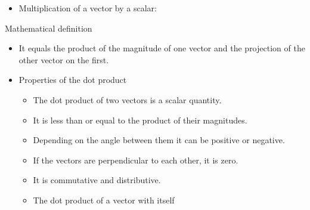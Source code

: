\ELhold


\begin{ELunit}


\begin{itemize}
\tightlist
\item
  Multiplication of a vector by a scalar:
\end{itemize}


\end{ELunit}

\ELhold


\begin{ELdefinition}{Mathematical definition}


\begin{itemize}
\tightlist
\item
  It equals the product of the magnitude of one vector and the projection of the other vector on the first.
\end{itemize}

\end{ELdefinition}

\begin{ELunit}


\begin{itemize}
\tightlist
\item
  Properties of the dot product

  \begin{itemize}
  \item
    The dot product of two vectors is a scalar quantity.
  \item
    It is less than or equal to the product of their magnitudes.
  \item
    Depending on the angle between them it can be positive or negative.
  \item
    If the vectors are perpendicular to each other, it is zero.
  \item
    It is commutative and distributive.
  \item
    The dot product of a vector with itself
  \end{itemize}
\end{itemize}

\end{ELunit}

